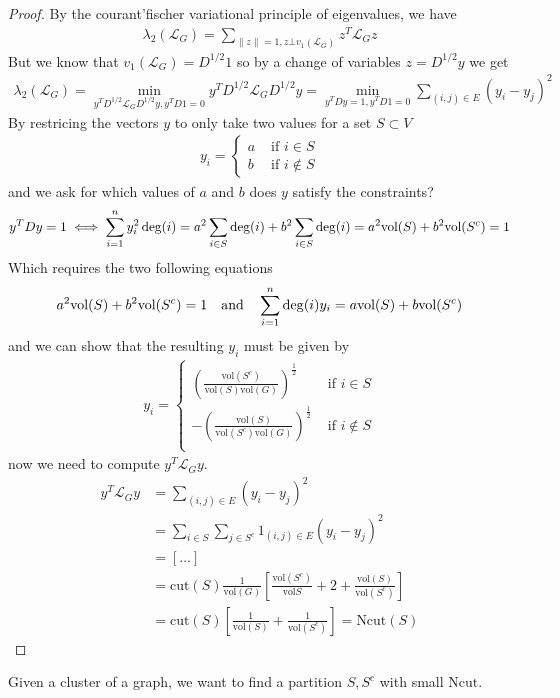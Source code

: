 \begin{proof}
  By the courant'fischer variational principle of eigenvalues, we have
\begin{align*}
  \lambda_2(\mathcal{L}_G)= \sum_{\|z\|=1, z \bot v_1(\mathcal{L}_G)} z^{T}\mathcal{L}_Gz
\end{align*}
But we know that $v_1(\mathcal{L}_G) = D^{1/2}1$ so by a change of variables $z = D^{1/2}y$ we get
\begin{align*}
  \lambda_2(\mathcal{L}_G) = \min_{y^{T}D^{1/2}\mathcal{L}_GD^{1/2}y,y^{T}D1 = 0}y^{T}D^{1/2}\mathcal{L}_GD^{1/2}y = \min_{y^{T}Dy=1,y^{T}D1=0}\sum_{(i,j) \in E}(y_i - y_j)^{2}
\end{align*}
By restricing the vectors $y$ to only take two values for a set $S \subset V$
\begin{align*}
  y_i = \left\{\begin{array}{ll}
    a & \text{ if }i \in S\\
    b & \text{ if }i \notin S
  \end{array} \right.
\end{align*}
and we ask for which values of $a$ and $b$ does $y$ satisfy the constraints?
\begin{align*}
  y^{T}Dy=1 \iff \sum_{i=1}^{n}y_i^{2} \operatorname{deg}(i) = a^{2} \sum_{i\in S}\operatorname{deg}(i) + b^{2} \sum_{i \in S}\operatorname{deg}(i) = a^{2} \text{vol}(S) + b^{2} \text{vol}(S^{c}) = 1
\end{align*}
Which requires the two following equations
\begin{align*}
  a^{2} \text{vol}(S) + b^{2}\text{vol}(S^{c}) = 1 \quad \text{and} \quad \sum_{i=1}^{n}\operatorname{deg}(i)y_i = a \text{vol}(S) + b \text{vol}(S^{c})
\end{align*}
and we can show that the resulting $y_i$ must be given by
\begin{align*}
  y_i =
  \left\{\begin{array}{ll}
      \left(
        \frac{\text{vol}(S^{c})}{\text{vol}(S)\text{vol}(G)}
      \right)^{\frac{1}{2}} & \text{ if } i \in S\\
      -\left(
        \frac{\text{vol}(S)}{\text{vol}(S^{c})\text{vol}(G)}
      \right)^{\frac{1}{2}} & \text{ if } i \notin S\\
  \end{array} \right.
\end{align*}
now we need to compute $y^{T}\mathcal{L}_Gy$.
\begin{align*}
  y^{T}\mathcal{L}_Gy 
  &= \sum_{(i,j) \in E}(y_i - y_j)^{2} 
  \\
  &= 
  \sum_{i \in S}\sum_{j \in S^{c}}1_{(i,j) \in E}(y_i - y_j)^{2}
  \\
  &=
  [...]
  \\
  &= \text{cut}(S) \frac{1}{\text{vol}(G)} \left[
    \frac{\text{vol}(S^{c})}{\text{vol}S} + 2 + \frac{\text{vol}(S)}{\text{vol}(S^{c})}
  \right]
  \\
  &=
  \text{cut}(S) \left[
    \frac{1}{\text{vol}(S)}
    +
    \frac{1}{\text{vol}(S^{c})}
  \right]
  = \text{Ncut}(S)
\end{align*}
\end{proof}



Given a cluster of a graph, we want to find a partition $S,S^{c}$ with small $\text{Ncut}$.
